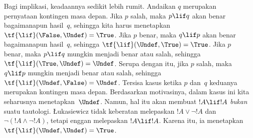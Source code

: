 \documentclass[../../../include/open-logic-section]{subfiles}
\begin{document}
Bagi implikasi, keadaannya sedikit lebih rumit. Andaikan $q$ merupakan
pernyataan kontingen masa depan. Jika $p$ salah, maka $p\lif q$ akan benar
bagaimanapun hasil~$q$, sehingga kita harus menetapkan
$\tf{\lif}(\False,\Undef)=\True$. Jika $p$ benar, maka $q\lif p$ akan benar
bagaimanapun hasil~$q$, sehingga $\tf{\lif}(\Undef,\True)=\True$. Jika $p$
benar, maka $p\lif q$ mungkin menjadi benar atau salah, sehingga
$\tf{\lif}(\True,\Undef)=\Undef$. Serupa dengan itu, jika $p$ salah, maka
$q\lif p$ mungkin menjadi benar atau salah, sehingga
$\tf{\lif}(\Undef,\False)=\Undef$. Tersisa kasus ketika $p$ dan~$q$
keduanya merupakan kontingen masa depan. Berdasarkan motivasinya, dalam kasus
ini kita seharusnya menetapkan~$\Undef$. Namun, hal itu akan membuat
$!A\lif !A$ \emph{bukan} suatu tautologi. \L ukasiewicz tidak keberatan
melepaskan $!A\lor\lnot !A$ dan $\lnot(!A\land\lnot !A)$, tetapi enggan
melepaskan $!A\lif !A$. Karena itu, ia menetapkan
$\tf{\lif}(\Undef,\Undef)=\True$.
\end{document}
